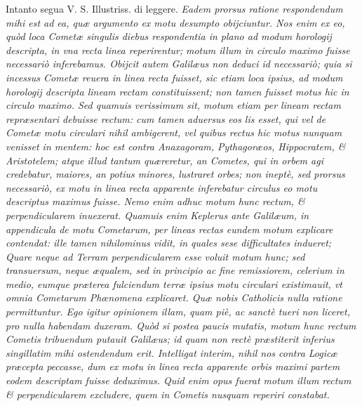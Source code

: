 \documentclass[11pt,twoside,openany]{book}
\begin{document}
\par\bigskip\noindent{}\enspace Intanto segua V. S. Illustriss. di leggere. \textit{Eadem prorsus ratione respondendum mihi est ad ea, quæ argumento ex motu desumpto obijciuntur. Nos enim ex eo, quòd loca Cometæ singulis diebus respondentia in plano ad modum horologij descripta, in vna recta linea reperirentur; }\textit{motum illum in circulo maximo fuisse necessariò inferebamus. Obijcit autem Galilæus non deduci id necessariò; quia si incessus Cometæ reuera in linea recta fuisset, sic etiam loca ipsius, ad modum horologij descripta lineam rectam constituissent; non tamen fuisset motus hic in circulo maximo. Sed quamuis verissimum sit, motum etiam per lineam rectam repræsentari debuisse rectum: cum tamen aduersus eos lis esset, qui vel de Cometæ motu circulari nihil ambigerent, vel quibus rectus hic motus nunquam venisset in mentem: hoc est contra Anaxagoram, Pythagoræos, Hippocratem, \& Aristotelem; atque illud tantum quæreretur, an Cometes, qui in orbem agi credebatur, maiores, an potius minores, lustraret orbes; non ineptè, sed prorsus necessariò, ex motu in linea recta apparente inferebatur circulus eo motu descriptus maximus fuisse. Nemo enim adhuc motum hunc rectum, \& perpendicularem inuexerat. Quamuis enim }\textit{Keplerus ante Galilæum, in appendicula de motu Cometarum, per lineas rectas eundem motum explicare contendat: ille tamen nihilominus vidit, in quales sese difficultates indueret; Quare neque ad Terram perpendicularem esse voluit motum hunc; sed transuersum, neque æqualem, sed in principio ac fine remissiorem, celerium in medio, eumque præterea fulciendum terræ ipsius motu circulari existimauit, vt omnia Cometarum Phœnomena explicaret. Quæ nobis Catholicis nulla ratione permittuntur. Ego igitur opinionem illam, quam piè, ac sanctè tueri non liceret, pro nulla habendam duxeram. Quòd si postea paucis mutatis, motum hunc rectum Cometis tribuendum putauit Galilæus; id quam non rectè præstiterit inferius singillatim mihi ostendendum erit. Intelligat interim, nihil nos contra Logicæ præcepta }\textit{peccasse, dum ex motu in linea recta apparente orbis maximi partem eodem descriptam fuisse deduximus. Quid enim opus fuerat motum illum rectum \& perpendicularem excludere,}\textit{ }\textit{quem in Cometis nusquam reperiri constabat.}
\end{document}
